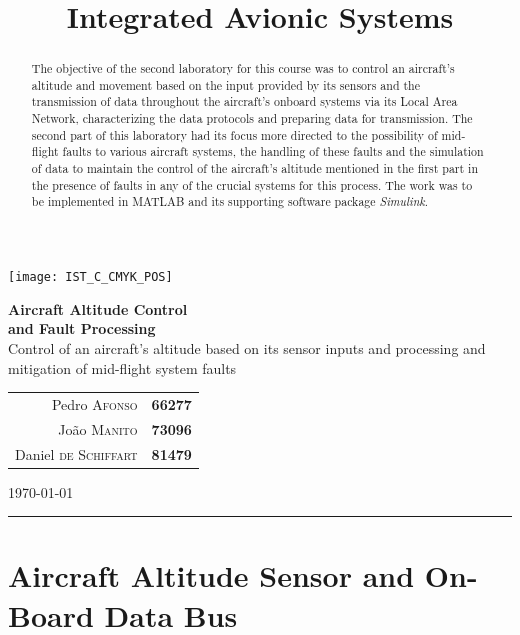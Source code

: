\documentclass[english,palatino]{ist-report}
\title{Integrated Avionic Systems}
\begin{document}
\thispagestyle{empty}

\begin{center}
	\texttt{[image: IST\_C\_CMYK\_POS]}
	
	\vspace*{3mm}
	{\huge \textbf{Aircraft Altitude Control\\and Fault Processing}} \\
	\vspace*{4mm}
	{\large Control of an aircraft's altitude based on its sensor inputs and processing and mitigation of mid-flight system faults}
	\vspace*{4mm} \\
	\begin{tabular}{r l}
		Pedro \textsc{Afonso} & \textbf{66277} \\
		João \textsc{Manito} & \textbf{73096} \\
		Daniel \textsc{de Schiffart} & \textbf{81479}
	\end{tabular}
	
	\vspace*{3mm}
	{\Large \today}
	\vspace*{4mm} \\
	\rule{\linewidth}{0.5pt}
\end{center}

\begin{abstract}
	The objective of the second laboratory for this course was to control an aircraft's altitude and movement based on the input provided by its sensors and the transmission of data throughout the aircraft's onboard systems via its Local Area Network, characterizing the data protocols and preparing data for transmission. The second part of this laboratory had its focus more directed to the possibility of mid-flight faults to various aircraft systems, the handling of these faults and the simulation of data to maintain the control of the aircraft's altitude mentioned in the first part in the presence of faults in any of the crucial systems for this process. The work was to be implemented in MATLAB and its supporting software package \textit{Simulink}.
\end{abstract}

{\hypersetup{linkcolor = black} \tableofcontents}

\part{Aircraft Altitude Sensor and On-Board Data Bus}
\end{document}
